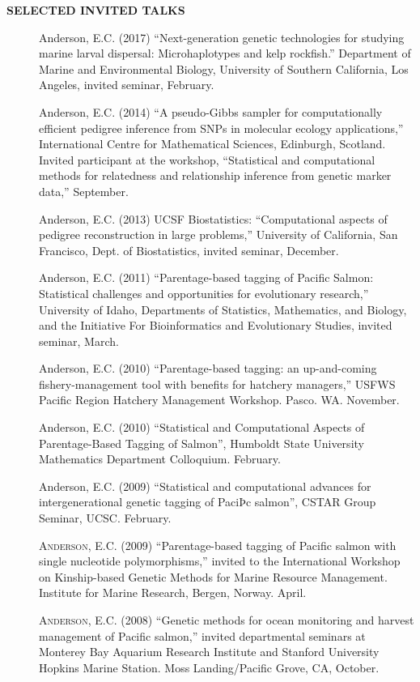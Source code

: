 \documentclass[11pt]{article}
\begin{document}
{\bf SELECTED INVITED TALKS}
\begin{description}
\item[] {\sc Anderson, E.C.} (2017) ``Next-generation genetic technologies for studying marine larval dispersal: Microhaplotypes and kelp rockfish.'' Department of Marine and Environmental Biology,  University of Southern California, Los Angeles, invited seminar, February.
\item[] {\sc Anderson, E.C.} (2014) ``A pseudo-Gibbs sampler for computationally efficient pedigree inference from SNPs in molecular ecology applications,'' International Centre
for Mathematical Sciences, Edinburgh, Scotland. Invited participant at the workshop, ``Statistical and computational methods for relatedness and relationship inference from genetic marker data,'' September.
\item[] {\sc Anderson, E.C.} (2013) UCSF Biostatistics: ``Computational aspects of pedigree reconstruction in large problems,'' University of California, San Francisco, Dept. of 
Biostatistics, invited seminar, December.
\item[] {\sc Anderson, E.C.} (2011) ``Parentage-based  tagging of Pacific Salmon: Statistical challenges and opportunities for evolutionary research,'' University of Idaho, Departments of Statistics, Mathematics, and Biology, and the Initiative For Bioinformatics and Evolutionary Studies, invited seminar, March.
\item[] {\sc Anderson, E.C.} (2010) ``Parentage-based tagging: an up-and-coming fishery-management tool with benefits for hatchery managers,'' USFWS Pacific Region Hatchery Management Workshop. Pasco. WA. November.
\item[] {\sc Anderson, E.C.} (2010) ``Statistical and Computational Aspects of Parentage-Based Tagging of Salmon'', Humboldt State University Mathematics Department Colloquium. February.
\item[] {\sc Anderson, E.C.} (2009) ``Statistical and computational advances for intergenerational genetic tagging of PaciÞc salmon'', CSTAR Group Seminar, UCSC. February.
\item[] \textsc{Anderson, E.C.} (2009)  ``Parentage-based tagging of Pacific salmon with single nucleotide polymorphisms,'' invited to the International Workshop on Kinship-based Genetic Methods for Marine Resource Management. Institute for Marine Research, Bergen, Norway. April.
\item[] \textsc{Anderson, E.C.} (2008) ``Genetic methods for ocean monitoring and  harvest management of Pacific salmon,'' invited departmental seminars at Monterey Bay Aquarium Research Institute and Stanford University Hopkins Marine Station.  Moss Landing/Pacific Grove, CA, October.

\end{description}
\end{document}
